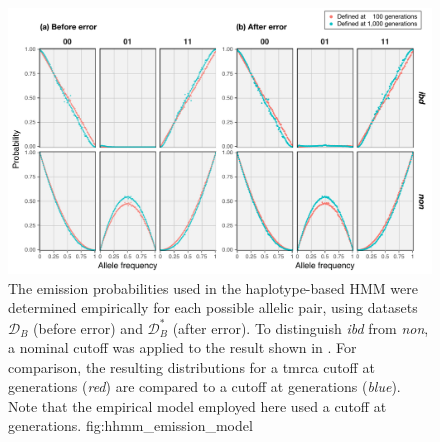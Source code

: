 

\begin{figure}[!htb]
\centering
\includegraphics[width=\textwidth]{./img/ch5/hhmm_emission_model_lowres}
{The emission probabilities used in the haplotype-based HMM were determined empirically for each possible allelic pair, using datasets $\mathcal{D}_B$ (before error) and $\mathcal{D}_B^{\ast}$ (after error).
To distinguish \emph{ibd} from \emph{non}, a nominal cutoff was applied to the result shown in .
For comparison, the resulting distributions for a \gls{tmrca} cutoff at  generations (\emph{red}) are compared to a cutoff at  generations (\emph{blue}).
Note that the empirical model employed here used a cutoff at  generations.}
{fig:hhmm_emission_model}
\end{figure}
